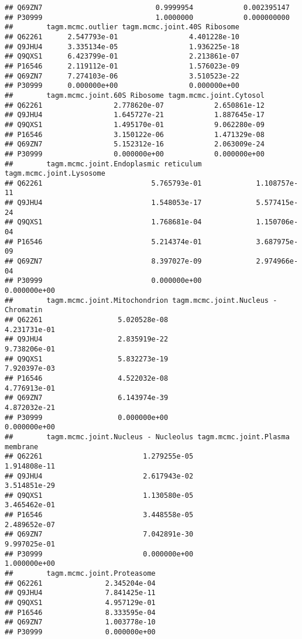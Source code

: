 \documentclass[]{article}
\begin{document}
\begin{verbatim}
## Q69ZN7                           0.9999954            0.002395147
## P30999                           1.0000000            0.000000000
##        tagm.mcmc.outlier tagm.mcmc.joint.40S Ribosome
## Q62261      2.547793e-01                 4.401228e-10
## Q9JHU4      3.335134e-05                 1.936225e-18
## Q9QXS1      6.423799e-01                 2.213861e-07
## P16546      2.119112e-01                 1.576023e-09
## Q69ZN7      7.274103e-06                 3.510523e-22
## P30999      0.000000e+00                 0.000000e+00
##        tagm.mcmc.joint.60S Ribosome tagm.mcmc.joint.Cytosol
## Q62261                 2.778620e-07            2.650861e-12
## Q9JHU4                 1.645727e-21            1.887645e-17
## Q9QXS1                 1.495170e-01            9.062280e-09
## P16546                 3.150122e-06            1.471329e-08
## Q69ZN7                 5.152312e-16            2.063009e-24
## P30999                 0.000000e+00            0.000000e+00
##        tagm.mcmc.joint.Endoplasmic reticulum tagm.mcmc.joint.Lysosome
## Q62261                          5.765793e-01             1.108757e-11
## Q9JHU4                          1.548053e-17             5.577415e-24
## Q9QXS1                          1.768681e-04             1.150706e-04
## P16546                          5.214374e-01             3.687975e-09
## Q69ZN7                          8.397027e-09             2.974966e-04
## P30999                          0.000000e+00             0.000000e+00
##        tagm.mcmc.joint.Mitochondrion tagm.mcmc.joint.Nucleus - Chromatin
## Q62261                  5.020528e-08                        4.231731e-01
## Q9JHU4                  2.835919e-22                        9.738206e-01
## Q9QXS1                  5.832273e-19                        7.920397e-03
## P16546                  4.522032e-08                        4.776913e-01
## Q69ZN7                  6.143974e-39                        4.872032e-21
## P30999                  0.000000e+00                        0.000000e+00
##        tagm.mcmc.joint.Nucleus - Nucleolus tagm.mcmc.joint.Plasma membrane
## Q62261                        1.279255e-05                    1.914808e-11
## Q9JHU4                        2.617943e-02                    3.514851e-29
## Q9QXS1                        1.130580e-05                    3.465462e-01
## P16546                        3.448558e-05                    2.489652e-07
## Q69ZN7                        7.042891e-30                    9.997025e-01
## P30999                        0.000000e+00                    1.000000e+00
##        tagm.mcmc.joint.Proteasome
## Q62261               2.345204e-04
## Q9JHU4               7.841425e-11
## Q9QXS1               4.957129e-01
## P16546               8.333595e-04
## Q69ZN7               1.003778e-10
## P30999               0.000000e+00
\end{verbatim}
\end{document}
